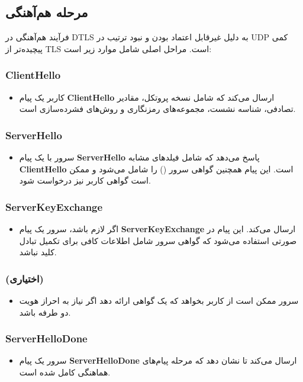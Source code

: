 \documentclass{report}
\begin{document}
\subsection*{مرحله هم‌آهنگی}	فرآیند هم‌آهنگی در DTLS به دلیل غیرقابل اعتماد بودن و نبود ترتیب در UDP کمی پیچیده‌تر از TLS است. مراحل اصلی شامل موارد زیر است:
	
\subsubsection*{ClientHello}
\begin{itemize}
	\item
	 کاربر یک پیام \textbf{ClientHello} ارسال می‌کند که شامل نسخه پروتکل، مقادیر تصادفی، شناسه نشست، مجموعه‌های رمزنگاری و روش‌های فشرده‌سازی است.
\end{itemize}

\subsubsection*{ServerHello}
\begin{itemize}
	\item
	 سرور با یک پیام \textbf{ServerHello} پاسخ می‌دهد که شامل فیلدهای مشابه \textbf{ClientHello} است. این پیام همچنین گواهی سرور () را شامل می‌شود و ممکن است گواهی کاربر نیز درخواست شود.
\end{itemize}

\subsubsection*{ServerKeyExchange}
\begin{itemize}
	\item
	 اگر لازم باشد، سرور یک پیام \textbf{ServerKeyExchange} ارسال می‌کند. این پیام در صورتی استفاده می‌شود که گواهی سرور شامل اطلاعات کافی برای تکمیل تبادل کلید نباشد.
\end{itemize}

\subsubsection*{ (اختیاری)}
\begin{itemize}
	\item
	 سرور ممکن است از کاربر بخواهد که یک گواهی ارائه دهد اگر نیاز به احراز هویت دو طرفه باشد.
\end{itemize}

\subsubsection*{ServerHelloDone}
\begin{itemize}
	\item
	 سرور یک پیام \textbf{ServerHelloDone} ارسال می‌کند تا نشان دهد که مرحله پیام‌های هماهنگی کامل شده است.
\end{itemize}
\end{document}

